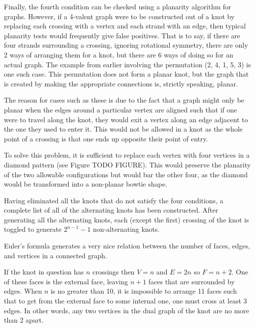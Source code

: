 \begin{paper}
Finally, the fourth condition can be checked using a planarity algorithm for
graphs.
However, if a 4-valent graph were to be constructed out of a knot by replacing
each crossing with a vertex and each strand with an edge, then typical planarity
tests would frequently give false positives.
That is to say, if there are four strands surrounding a crossing, ignoring
rotational symmetry, there are only 2 ways of arranging them for a knot, but
there are 6 ways of doing so for an actual graph.
The example from earlier involving the permutation (2, 4, 1, 5, 3) is one such
case.
This permutation does not form a planar knot, but the graph that is created by
making the appropriate connections is, strictly speaking, planar.

The reason for cases such as these is due to the fact that a graph might only be
planar when the edges around a particular vertex are aligned such that if one
were to travel along the knot, they would exit a vertex along an edge adjacent
to the one they used to enter it.
This would not be allowed in a knot as the whole point of a crossing is that one
ends up opposite their point of entry.

To solve this problem, it is sufficient to replace each vertex with four
vertices in a diamond pattern (see Figure TODO FIGURE).
This would preserve the planarity of the two allowable configurations but would
bar the other four, as the diamond would be transformed into a non-planar bowtie
shape.

Having eliminated all the knots that do not satisfy the four conditions, a
complete list of all of the alternating knots has been constructed.
After generating all the alternating knots, each (except the first) crossing
of the knot is toggled to generate $2^{n-1}-1$ non-alternating knots.

Euler's formula generates a very nice relation between the number of faces,
edges, and vertices in a connected graph.
\begin{paperwhere}
\end{paperwhere}
If the knot in question has $n$ crossings then $V=n$ and $E=2n$ so $F=n+2$.
One of these faces is the external face, leaving $n+1$ faces that are surrounded
by edges.
When $n$ is no greater than 10, it is impossible to arrange 11 faces such that
to get from the external face to some internal one, one must cross at least 3
edges.
In other words, any two vertices in the dual graph of the knot are no more than
2 apart.


\end{paper}

